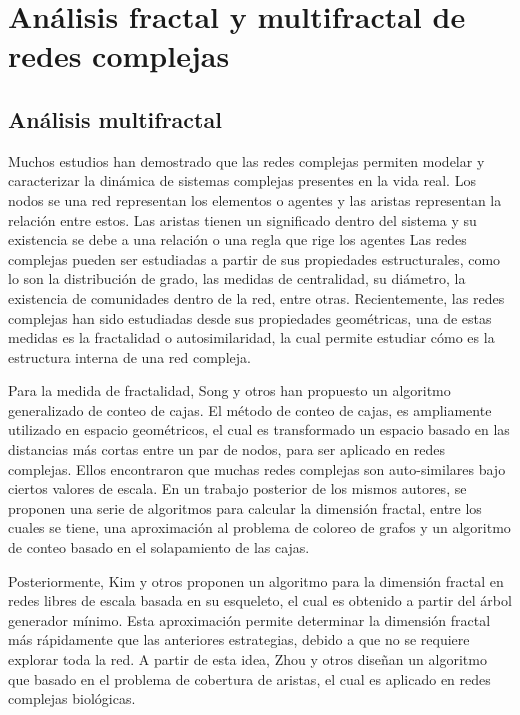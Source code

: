 \section{Análisis fractal y multifractal de redes complejas}

\subsection{Análisis multifractal}

Muchos estudios han demostrado que las redes complejas permiten modelar y caracterizar la dinámica de sistemas complejas presentes en la vida real. Los nodos se una red representan los elementos o agentes y las aristas representan la relación entre estos. Las aristas tienen un significado dentro del sistema y su existencia se debe a una relación o una regla que rige los agentes Las redes complejas pueden ser estudiadas a partir de sus propiedades estructurales, como lo son la distribución de grado, las medidas de centralidad, su diámetro, la existencia de comunidades dentro de la red, entre otras. Recientemente, las redes complejas han sido estudiadas desde sus propiedades geométricas, una de estas medidas es la fractalidad o autosimilaridad, la cual permite estudiar cómo es la estructura interna de una red compleja.

Para la medida de fractalidad, Song y otros\cite{Song2005} han propuesto un algoritmo generalizado de conteo de cajas. El método de conteo de cajas, es ampliamente utilizado en espacio geométricos, el cual es transformado un espacio basado en las distancias más cortas entre un par de nodos, para ser aplicado en redes complejas. Ellos encontraron que muchas redes complejas son auto-similares bajo ciertos valores de escala. En un trabajo posterior de los mismos autores\cite{Song2007}, se proponen una serie de algoritmos para calcular la dimensión fractal, entre los cuales se tiene, una aproximación al problema de coloreo de grafos y un algoritmo de conteo basado en el solapamiento de las cajas.

Posteriormente, Kim y otros\cite{Kim2007A}\cite{Kim2007B} proponen un algoritmo para la dimensión fractal en redes libres de escala basada en su esqueleto, el cual es obtenido a partir del árbol generador mínimo. Esta aproximación permite determinar la dimensión fractal más rápidamente que las anteriores estrategias, debido a que no se requiere explorar toda la red. A partir de esta idea, Zhou y otros\cite{Zhou2007} diseñan un algoritmo que basado en el problema de cobertura de aristas, el cual es aplicado en redes complejas biológicas. 

